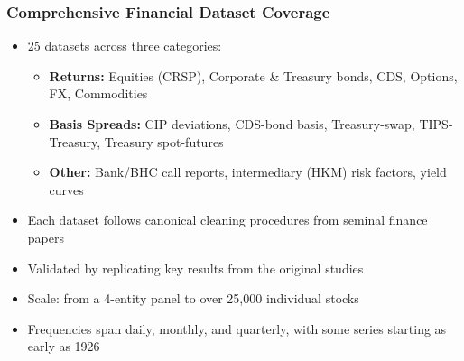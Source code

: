\documentclass[ignorenonframetext, 9pt]{beamer}
\begin{document}
\begin{frame}
  \frametitle{Comprehensive Financial Dataset Coverage}
  \begin{itemize}
  \item \alert{25 datasets} across three categories:
  \vspace{0.1cm}
  \begin{itemize}
    \item \textbf{Returns:} Equities (CRSP), Corporate \& Treasury bonds, CDS, Options, FX, Commodities
    \item \textbf{Basis Spreads:} CIP deviations, CDS-bond basis, Treasury-swap, TIPS-Treasury, Treasury spot-futures
    \item \textbf{Other:} Bank/BHC call reports, intermediary (HKM) risk factors, yield curves
  \end{itemize}
  \vspace{0.2cm}
  \item Each dataset follows \alert{canonical cleaning procedures} from seminal finance papers
  \vspace{0.1cm}
  \item Validated by replicating key results from the original studies
  \vspace{0.1cm}
  \item Scale: from a 4-entity panel to over 25,000 individual stocks
  \item Frequencies span daily, monthly, and quarterly, with some series starting as early as 1926
  \end{itemize}
\label{slide:data_overview}
\end{frame}
\end{document}
